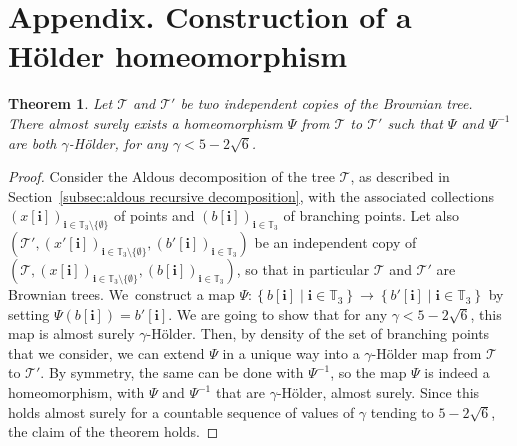 \documentclass[JEP,XML,SOM,Unicode,NoFloatCountersInSection,published]{cedram}
\let\backslash\setminus
\newcommand{\enstq}[2]{\left\lbrace#1\mathrel{}\middle|\mathrel{}#2\right\rbrace}
\newcommand{\Tt}{\mathcal{T}}
\newcommand{\ii}{\mathbf{i}}
\theoremstyle{plain}
\newtheorem{theorem}{Theorem}
\theoremstyle{definition}
\begin{document}
\appendix

\section*{Appendix. Construction of a Hölder homeomorphism}
\label{app:construction of homeomorphism}

\begin{theorem}\label{thm:existence_holder_homeomorphism}
Let $\Tt$ and $\Tt'$ be two independent copies of the Brownian tree.
There almost surely exists a homeomorphism $\Psi$ from $\Tt$ to $\Tt'$ such that $\Psi$ and $\Psi^{-1}$ are both $\gamma$-Hölder, for any $\gamma < 5-2\sqrt{6}$.
\end{theorem}
\begin{proof}
Consider the Aldous decomposition of the tree $\mathcal{T}$, as described in Section~\ref{subsec:aldous recursive decomposition}, with the associated collections $(x[\ii])_{\ii \in \mathbb{T}_3 \backslash \{ \emptyset\}}$ of points and $(b[\ii])_{\ii\in \mathbb T_3}$ of branching points.
Let also $\left( \mathcal{T}', (x'[\ii])_{\ii \in \mathbb{T}_3 \backslash \{ \emptyset\}}, (b'[\ii])_{\ii\in \mathbb T_3} \right)$ be an independent copy of $\left( \mathcal{T}, (x[\ii])_{\ii \in \mathbb{T}_3 \backslash \{ \emptyset\}}, (b[\ii])_{\ii\in \mathbb T_3} \right)$, so that in particular $\Tt$ and $\Tt'$ are Brownian trees.
We~construct a map $\Psi : \enstq{b[\ii]}{ \ii\in \mathbb T_3} \rightarrow \enstq{b'[\ii]}{\ii\in \mathbb T_3}$ by setting $\Psi(b[\ii])= b'[\ii]$.
We are going to show that for any $\gamma < 5-2\sqrt{6}$, this map is almost surely $\gamma$-Hölder.
Then, by density of the set of branching points that we consider, we can extend $\Psi$ in a unique way into a $\gamma$-Hölder map from $\Tt$ to $\Tt'$.
By symmetry, the same can be done with $\Psi^{-1}$, so the map $\Psi$ is indeed a homeomorphism, with $\Psi$ and $\Psi^{-1}$ that are $\gamma$-Hölder, almost surely.
Since this holds almost surely for a countable sequence of values of $\gamma$ tending to $5-2\sqrt{6}$, the claim of the theorem holds.


\end{proof}
\end{document}
